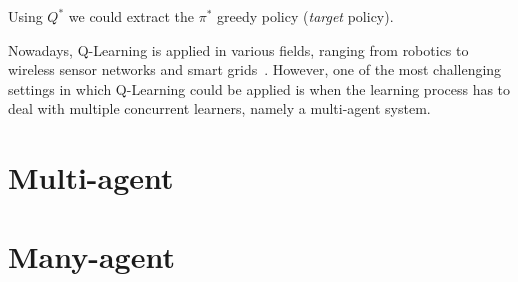 %
Using $Q^*$ we could extract the $\pi^*$ greedy policy (\emph{target} policy).

Nowadays, Q-Learning is applied in various fields, ranging from robotics to wireless sensor networks and smart grids~\cite{DBLP:journals/access/JangKHK19}.
%
However, one of the most challenging settings in which Q-Learning could be applied is when the learning process has to deal with multiple concurrent learners, namely a multi-agent system.
\section{Multi-agent}
\section{Many-agent}